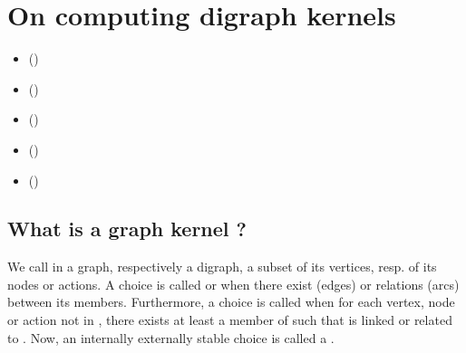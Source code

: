 \documentclass[a4paper,10pt,english]{sphinxhowto}
\begin{document}
\section{On computing digraph kernels}
\label{\detokenize{tutorial:on-computing-digraph-kernels}}\label{\detokenize{tutorial:kernel-tutorial-label}}
\begin{sphinxShadowBox}
\begin{itemize}
\item {} 
\label{\detokenize{tutorial:id225}}{\hyperref[\detokenize{tutorial:what-is-a-graph-kernel}]{}} ()

\item {} 
\label{\detokenize{tutorial:id226}}{\hyperref[\detokenize{tutorial:initial-and-terminal-kernels}]{}} ()

\item {} 
\label{\detokenize{tutorial:id227}}{\hyperref[\detokenize{tutorial:kernels-in-lateralized-digraphs}]{}} ()

\item {} 
\label{\detokenize{tutorial:id228}}{\hyperref[\detokenize{tutorial:computing-good-and-bad-choice-recommendations}]{}} ()

\item {} 
\label{\detokenize{tutorial:id229}}{\hyperref[\detokenize{tutorial:tractability}]{}} ()

\end{itemize}
\end{sphinxShadowBox}


\subsection{What is a graph kernel ?}
\label{\detokenize{tutorial:what-is-a-graph-kernel}}
We call  in a graph, respectively a digraph, a subset of its vertices, resp. of its nodes or actions. A choice  is called  or  when there exist  (edges) or relations (arcs) between its members. Furthermore, a choice  is called  when for each vertex, node or action  not in , there exists at least a member  of  such that  is linked or related to . Now, an internally  externally stable choice is called a .
\end{document}
